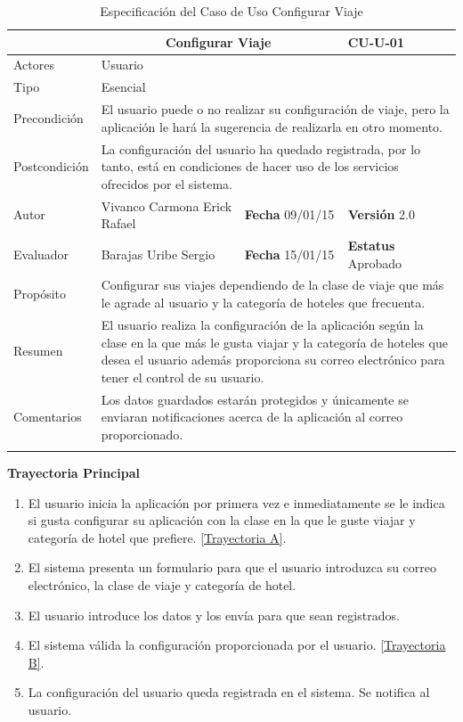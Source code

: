 \begin{longtable}{|p{2.5cm}|p{6.4cm}|p{2cm}|p{2cm}|}
	\hline
		\rowcolor[RGB]{255,102,102}{Caso de Uso}&\multicolumn{2}{c}{Configurar Viaje}&{\textbf{CU-U-01}}\\
	\hline
		{Actores}&\multicolumn{3}{p{11.2cm}|}{Usuario}\\
	\hline
		{Tipo}&\multicolumn{3}{p{11.2cm}|}{Esencial}\\
	\hline
		{Precondición}&\multicolumn{3}{p{11.2cm}|}{El usuario puede o no realizar su configuración de viaje, pero la aplicación le hará la sugerencia de realizarla en otro momento.}\\
	\hline
		{Postcondición}&\multicolumn{3}{p{11.2cm}|}{La configuración del usuario ha quedado registrada, por lo tanto, está en condiciones de hacer uso de los servicios ofrecidos por el sistema.}\\
	\hline
		{Autor}&{Vivanco Carmona Erick Rafael}&{\textbf{Fecha} 09/01/15}&{\textbf{Versión} 2.0}\\
			\hline
		{Evaluador}&{Barajas Uribe Sergio}&{\textbf{Fecha} 15/01/15}&{\textbf{Estatus} Aprobado}\\
	\hline
		{Propósito}&\multicolumn{3}{p{11.2cm}|}{Configurar sus viajes dependiendo de la clase de viaje que más le agrade al usuario y la categoría de hoteles que frecuenta.}\\
	\hline
		{Resumen}&\multicolumn{3}{p{11.2cm}|}{El usuario realiza la configuración de la aplicación según la clase en la que más le gusta viajar y la categoría de hoteles que desea el usuario además proporciona su correo electrónico para tener el control de su usuario.}\\	
	\hline
		{Comentarios}&\multicolumn{3}{p{11.2cm}|}{Los datos guardados estarán protegidos y únicamente se enviaran notificaciones acerca de la aplicación al correo proporcionado.}\\	
	\hline
	\caption[Especificación del Caso de Uso Configurar Viaje]{Especificación del Caso de Uso Configurar Viaje}
    	\label{tab:cuConfigurarViaje}
\end{longtable}
\newpage
\begin{flushleft}
	\textbf{Trayectoria Principal}\\
	\begin{enumerate}
		\item El usuario inicia la aplicación por primera vez e inmediatamente se le indica si gusta configurar su aplicación con la clase en la que le guste viajar y categoría de hotel que prefiere. \hyperlink{TrayectoriaA_CU-U-01}{[Trayectoria A]}.
		\item El sistema presenta un formulario para que el usuario introduzca su correo electrónico, la clase de viaje y categoría de hotel.
		\item El usuario introduce los datos y los envía para que sean registrados.
		\item El sistema válida la configuración proporcionada por el usuario. \hyperlink{TrayectoriaB_CU-U-01}{[Trayectoria B]}.
		\item La configuración del usuario queda registrada en el sistema. Se notifica al usuario.
	\end{enumerate}
\end{flushleft}

